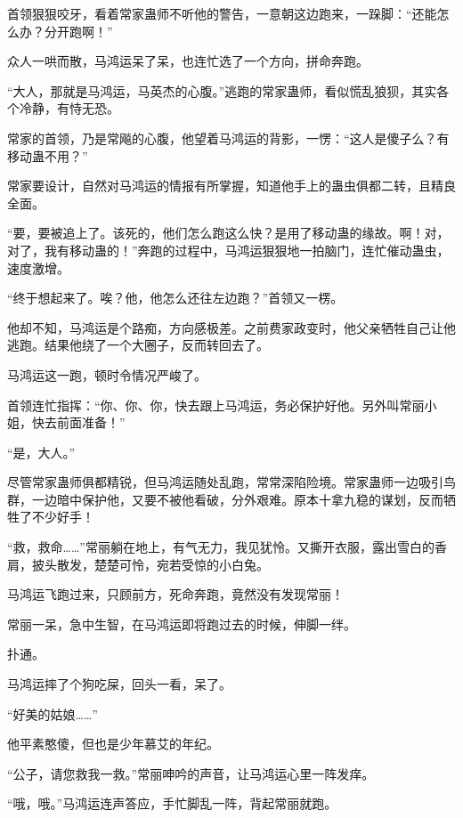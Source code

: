 \begin{this_body}
首领狠狠咬牙，看着常家蛊师不听他的警告，一意朝这边跑来，一跺脚：“还能怎么办？分开跑啊！”

众人一哄而散，马鸿运呆了呆，也连忙选了一个方向，拼命奔跑。

“大人，那就是马鸿运，马英杰的心腹。”逃跑的常家蛊师，看似慌乱狼狈，其实各个冷静，有恃无恐。

常家的首领，乃是常飚的心腹，他望着马鸿运的背影，一愣：“这人是傻子么？有移动蛊不用？”

常家要设计，自然对马鸿运的情报有所掌握，知道他手上的蛊虫俱都二转，且精良全面。

“要，要被追上了。该死的，他们怎么跑这么快？是用了移动蛊的缘故。啊！对，对了，我有移动蛊的！”奔跑的过程中，马鸿运狠狠地一拍脑门，连忙催动蛊虫，速度激增。

“终于想起来了。唉？他，他怎么还往左边跑？”首领又一楞。

他却不知，马鸿运是个路痴，方向感极差。之前费家政变时，他父亲牺牲自己让他逃跑。结果他绕了一个大圈子，反而转回去了。

马鸿运这一跑，顿时令情况严峻了。

首领连忙指挥：“你、你、你，快去跟上马鸿运，务必保护好他。另外叫常丽小姐，快去前面准备！”

“是，大人。”

尽管常家蛊师俱都精锐，但马鸿运随处乱跑，常常深陷险境。常家蛊师一边吸引鸟群，一边暗中保护他，又要不被他看破，分外艰难。原本十拿九稳的谋划，反而牺牲了不少好手！

“救，救命……”常丽躺在地上，有气无力，我见犹怜。又撕开衣服，露出雪白的香肩，披头散发，楚楚可怜，宛若受惊的小白兔。

马鸿运飞跑过来，只顾前方，死命奔跑，竟然没有发现常丽！

常丽一呆，急中生智，在马鸿运即将跑过去的时候，伸脚一绊。

扑通。

马鸿运摔了个狗吃屎，回头一看，呆了。

“好美的姑娘……”

他平素憨傻，但也是少年慕艾的年纪。

“公子，请您救我一救。”常丽呻吟的声音，让马鸿运心里一阵发痒。

“哦，哦。”马鸿运连声答应，手忙脚乱一阵，背起常丽就跑。

\end{this_body}

